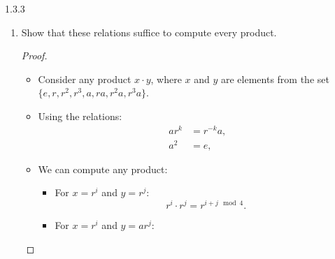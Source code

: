 \documentclass[12pt]{amsart}
\theoremstyle{definition}
\numberwithin{equation}{section}
\begin{document}
\begin{exercise}{1.3.3}
\begin{enumerate}[label=\alph*.]
\begin{proof}
\begin{itemize}[label=--]
                    \begin{equation*}
                    ar^{-1} = r \cdot a.
                    \end{equation*}
                    \item Assume \(ar^{-k} = r^ka\) for some \(k\).
                    \item For \(k + 1\):
                    \begin{align*}
                    ar^{-(k+1)} &= ar^{-k-1} \\
                             &= ar^{-k} \cdot r^{-1} \\
                             &= r^ka \cdot r^{-1} \\
                             &= r^k \cdot r^{-1} \cdot a \\
                             &= r^{k-1}a.
                    \end{align*}
                    \item Therefore, \(ar^k = r^{-k}a\) holds for all \(k \in \mathbb{Z}\).
                \end{itemize}
            \end{proof}
                \item Show that these relations suffice to compute every product.
                \begin{proof} \( \)
                \begin{itemize}[label=--]
                    \item Consider any product \(x \cdot y\), where \(x\) and \(y\) are elements from the set \(\{e, r, r^2, r^3, a, ra, r^2a, r^3a\}\).
                    \item Using the relations:
                    \begin{align*}
                    ar^k &= r^{-k}a, \\
                    a^2 &= e,
                    \end{align*}
                    \item We can compute any product:
                    \begin{itemize}[label=--]
                        \item For \(x = r^i\) and \(y = r^j\):
                        \begin{equation*}
                        r^i \cdot r^j = r^{i+j \mod 4}.
                        \end{equation*}
                        \item For \(x = r^i\) and \(y = ar^j\):

\end{itemize}
\end{itemize}
\end{proof}
\end{enumerate}
\end{exercise}
\end{document}
